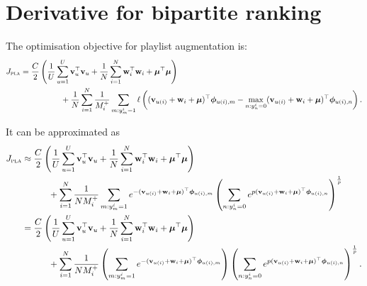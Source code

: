 \section{Derivative for bipartite ranking}

The optimisation objective for playlist augmentation is:
\begin{equation}
\label{eq:primal_pla}
\begin{aligned}
J_\textsc{pla} 
&= \frac{C}{2} \left( \frac{1}{U} \sum_{u=1}^U \mathbf{v}_u^\top \mathbf{v}_u 
     + \frac{1}{N} \sum_{i=1}^N \mathbf{w}_i^\top \mathbf{w}_i + \bm{\mu}^\top \bm{\mu} \right) \\
& \hspace{5em}
     + \frac{1}{N} \sum_{i=1}^N \frac{1}{M_i^+} \sum_{m: y_m^i = 1} \ell \left( (\mathbf{v}_{u(i)} + \mathbf{w}_i + \bm{\mu})^\top \bm{\phi}_{u(i),m}
     - \max_{n: y_n^i = 0} (\mathbf{v}_{u(i)} + \mathbf{w}_i + \bm{\mu})^\top \bm{\phi}_{u(i),n} \right).
\end{aligned}
\end{equation}

It can be approximated as
\begin{equation*}
\begin{aligned}
J_\textsc{pla} 
&\approx \frac{C}{2} \left( \frac{1}{U} \sum_{u=1}^U \mathbf{v}_u^\top \mathbf{v}_u + \frac{1}{N} \sum_{i=1}^N \mathbf{w}_i^\top \mathbf{w}_i + \bm{\mu}^\top \bm{\mu} \right) \\
& \hspace{3em}
  + \sum_{i=1}^N \frac{1}{N M_i^+} \sum_{m: y_m^i = 1} 
    e^{-(\mathbf{v}_{u(i)} + \mathbf{w}_i + \bm{\mu})^\top \bm{\phi}_{u(i),m}}
    \left( \sum_{n: y_n^i = 0} e^{p (\mathbf{v}_{u(i)} + \mathbf{w}_i + \bm{\mu})^\top \bm{\phi}_{u(i),n}} \right)^\frac{1}{p} \\
&= \frac{C}{2} \left( \frac{1}{U} \sum_{u=1}^U \mathbf{v}_u^\top \mathbf{v}_u + \frac{1}{N} \sum_{i=1}^N \mathbf{w}_i^\top \mathbf{w}_i + \bm{\mu}^\top \bm{\mu} \right) \\
& \hspace{3em}
  + \sum_{i=1}^N \frac{1}{N M_i^+} 
    \left( \sum_{m: y_m^i = 1} e^{-(\mathbf{v}_{u(i)} + \mathbf{w}_i + \bm{\mu})^\top \bm{\phi}_{u(i),m}} \right)
    \left( \sum_{n: y_n^i = 0} e^{p (\mathbf{v}_{u(i)} + \mathbf{w}_i + \bm{\mu})^\top \bm{\phi}_{u(i),n}} \right)^\frac{1}{p}.
\end{aligned}
\end{equation*}

